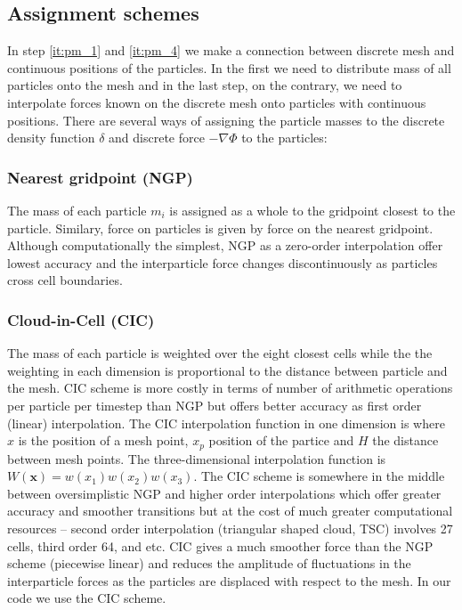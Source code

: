 \subsection{Assignment schemes}
In step \ref{it:pm_1} and \ref{it:pm_4} we make a connection between discrete mesh and continuous positions of the particles. In the first we need to distribute mass of all particles onto the mesh and in the last step, on the contrary, we need to interpolate forces known on the discrete mesh onto particles with continuous positions. There are several ways of assigning the particle masses to the discrete density function $\delta$ and discrete force $-\nabla\Phi$ to the particles:

\subsubsection{Nearest gridpoint (NGP)}
The mass of each particle $m_i$ is assigned as a whole to the gridpoint closest to the particle. Similary, force on particles is given by force on the nearest gridpoint. Although computationally the simplest, NGP as a zero-order interpolation offer lowest accuracy and the interparticle force changes discontinuously as particles cross cell boundaries.

\subsubsection{Cloud-in-Cell (CIC)}
The mass of each particle is weighted over the eight closest cells while the the weighting in each dimension is proportional to the distance between particle and the mesh. CIC scheme is more costly in terms of number of arithmetic operations per particle per timestep than NGP but offers better accuracy as first order (linear) interpolation. The CIC interpolation function in one dimension is
where $x$ is the position of a mesh point, $x_p$ position of the partice and $H$ the distance between mesh points. The three-dimensional interpolation function is \(W(\mathbf x)=w(x_1)w(x_2)w(x_3)\). The CIC scheme is somewhere in the middle between oversimplistic NGP and higher order interpolations which offer greater accuracy and smoother transitions but at the cost of much greater computational resources -- second order interpolation (triangular shaped cloud, TSC) involves 27 cells, third order 64, and etc. CIC gives a much smoother force than the NGP scheme (piecewise linear) and reduces the amplitude of fluctuations in the interparticle forces as the particles are displaced with respect to the mesh. In our code we use the CIC scheme.
